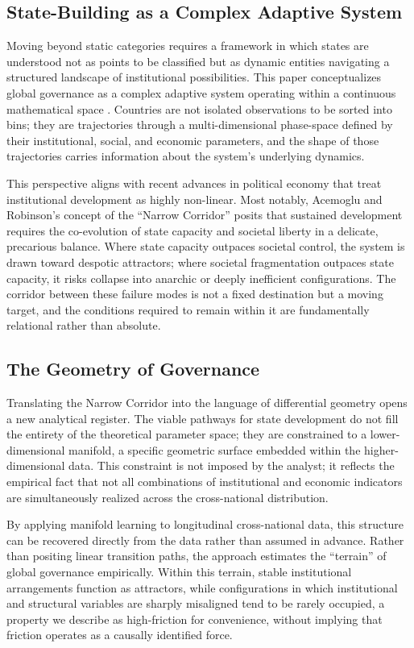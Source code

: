 \documentclass[12pt]{article}
\begin{document}
\subsection{State-Building as a Complex Adaptive System}
Moving beyond static categories requires a framework in which states are understood not as points to be classified but as dynamic entities navigating a structured landscape of institutional possibilities. This paper conceptualizes global governance as a complex adaptive system operating within a continuous mathematical space \cite{miller2007complex, simon1962architecture}. Countries are not isolated observations to be sorted into bins; they are trajectories through a multi-dimensional phase-space defined by their institutional, social, and economic parameters, and the shape of those trajectories carries information about the system's underlying dynamics.

This perspective aligns with recent advances in political economy that treat institutional development as highly non-linear. Most notably, Acemoglu and Robinson's concept of the ``Narrow Corridor'' \cite{acemoglu2019narrow, acemoglu2012why} posits that sustained development requires the co-evolution of state capacity and societal liberty in a delicate, precarious balance. Where state capacity outpaces societal control, the system is drawn toward despotic attractors; where societal fragmentation outpaces state capacity, it risks collapse into anarchic or deeply inefficient configurations. The corridor between these failure modes is not a fixed destination but a moving target, and the conditions required to remain within it are fundamentally relational rather than absolute.

\subsection{The Geometry of Governance}

Translating the Narrow Corridor into the language of differential geometry opens a new analytical register. The viable pathways for state development do not fill the entirety of the theoretical parameter space; they are constrained to a lower-dimensional manifold, a specific geometric surface embedded within the higher-dimensional data. This constraint is not imposed by the analyst; it reflects the empirical fact that not all combinations of institutional and economic indicators are simultaneously realized across the cross-national distribution.

By applying manifold learning to longitudinal cross-national data, this structure can be recovered directly from the data rather than assumed in advance. Rather than positing linear transition paths, the approach estimates the ``terrain'' of global governance empirically. Within this terrain, stable institutional arrangements function as attractors, while configurations in which institutional and structural variables are sharply misaligned tend to be rarely occupied, a property we describe as high-friction for convenience, without implying that friction operates as a causally identified force.
\end{document}
